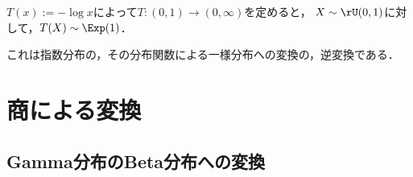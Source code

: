 \documentclass[uplatex,dvipdfmx]{jsreport}
\begin{document}
\begin{proposition}
    $T(x):=-\log x$によって$T:(0,1)\to(0,\infty)$を定めると，
    $X\sim\rU(0,1)$に対して，$T(X)\sim\Exp(1)$．
\end{proposition}
\begin{remark}
    これは指数分布の，その分布関数による一様分布への変換の，逆変換である．
\end{remark}

\section{商による変換}

\subsection{Gamma分布のBeta分布への変換}
\end{document}
